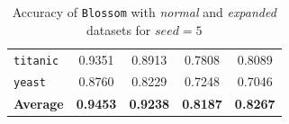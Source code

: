 \documentclass[12pt]{report}
\theoremstyle{definition}
\theoremstyle{definition}
\theoremstyle{definition}
\begin{document}
\begin{table}[ht]
\begin{tabular}{lcccc}
    \multicolumn{1}{l}{\tt titanic}       & \multicolumn{1}{c}{0.9351} & \multicolumn{1}{c}{0.8913} & \multicolumn{1}{c}{0.7808} & \multicolumn{1}{c}{0.8089} \\
    \multicolumn{1}{l}{\tt yeast}         & \multicolumn{1}{c}{0.8760} & \multicolumn{1}{c}{0.8229} & \multicolumn{1}{c}{0.7248} & \multicolumn{1}{c}{0.7046} \\
    \hline
    \multicolumn{1}{l}{\bf Average}       & \multicolumn{1}{c}{\bf 0.9453} & \multicolumn{1}{c}{\bf 0.9238} & \multicolumn{1}{c}{\bf 0.8187} & \multicolumn{1}{c}{\bf 0.8267} \\
    \hline
    \end{tabular}
    \caption{Accuracy of \texttt{Blossom} with \textit{normal} and \textit{expanded} datasets for $seed=5$}
    \label{fig:seed5}
\end{table}
\end{document}

